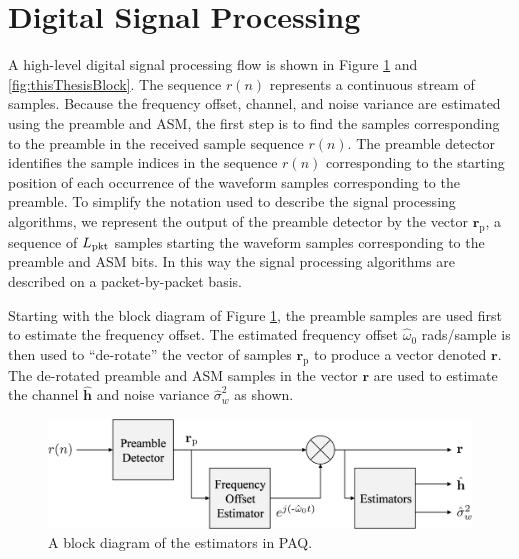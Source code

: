 \section{Digital Signal Processing}
\label{sec:signalProcessing}
A high-level digital signal processing flow is shown in Figure \ref{fig:estimators} and \ref{fig:thisThesisBlock}.
The sequence $r(n)$ represents a continuous stream of samples.
Because the frequency offset, channel, and noise variance are estimated using the preamble and ASM, the first step is to find the samples corresponding to the preamble in the received sample sequence $r(n)$.
The preamble detector identifies the sample indices in the sequence $r(n)$ corresponding to the starting position of each occurrence of the waveform samples corresponding to the preamble.
To simplify the notation used to describe the signal processing algorithms, we represent the output of the preamble detector by the vector $\mathbf{r}_\text{p}$, a sequence of $L_\text{pkt}$ samples starting the waveform samples corresponding to the preamble and ASM bits.
In this way the signal processing algorithms are described on a packet-by-packet basis.

Starting with the block diagram of Figure \ref{fig:estimators}, the preamble samples are used first to estimate the frequency offset.
The estimated frequency offset $\hat{\omega}_0$ rads/sample is then used to ``de-rotate'' the vector of samples $\mathbf{r}_\text{p}$ to produce a vector denoted $\mathbf{r}$.
The de-rotated preamble and ASM samples in the vector $\mathbf{r}$ are used to estimate the channel $\hat{\mathbf{h}}$ and noise variance $\hat{\sigma}^2_w$ as shown.
\begin{figure}
	\centering\includegraphics[width=8.75in/100*55]{figures/intro/estimators.pdf}
	\caption{A block diagram of the estimators in PAQ.}
	\label{fig:estimators}
\end{figure}

